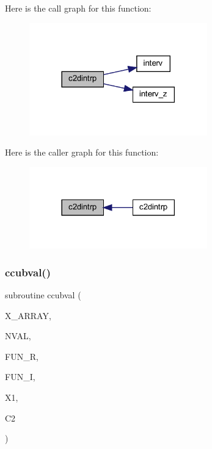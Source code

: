 Here is the call graph for this function\+:\nopagebreak
\begin{figure}[H]
\begin{center}
\leavevmode
\includegraphics[width=218pt]{Leroi_8f90_ab444c66af8ac23d415864bbbd3ff9872_cgraph}
\end{center}
\end{figure}
Here is the caller graph for this function\+:\nopagebreak
\begin{figure}[H]
\begin{center}
\leavevmode
\includegraphics[width=218pt]{Leroi_8f90_ab444c66af8ac23d415864bbbd3ff9872_icgraph}
\end{center}
\end{figure}
\mbox{\label{Leroi_8f90_a5a4be24a4461d42dc9be5d5388c4d366}} 
\subsubsection{\texorpdfstring{ccubval()}{ccubval()}}
{\footnotesize\ttfamily subroutine ccubval (\begin{DoxyParamCaption}\item[{real, dimension(nval)}]{X\+\_\+\+A\+R\+R\+AY,  }\item[{integer}]{N\+V\+AL,  }\item[{real, dimension(4,nval)}]{F\+U\+N\+\_\+R,  }\item[{real, dimension(4,nval)}]{F\+U\+N\+\_\+I,  }\item[{real}]{X1,  }\item[{complex}]{C2 }\end{DoxyParamCaption})}

